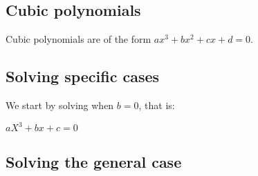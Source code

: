 
\subsection{Cubic polynomials}

Cubic polynomials are of the form \(ax^3+bx^2+cx+d=0\).

\subsection{Solving specific cases}

We start by solving when \(b=0\), that is:

\(aX^3+bx+c=0\)

\subsection{Solving the general case}

